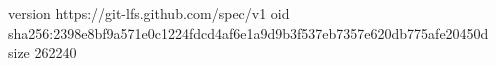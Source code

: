 version https://git-lfs.github.com/spec/v1
oid sha256:2398e8bf9a571e0c1224fdcd4af6e1a9d9b3f537eb7357e620db775afe20450d
size 262240
